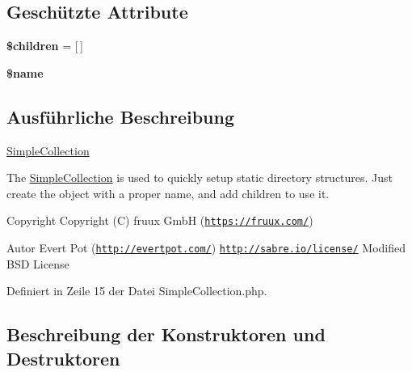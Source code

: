 \subsection*{Geschützte Attribute}
\begin{DoxyCompactItemize}
\item 
\mbox{\label{class_sabre_1_1_d_a_v_1_1_simple_collection_abfacfa128b6948de67ac5bded61922ab}} 
{\bfseries \$children} = \mbox{[}$\,$\mbox{]}
\item 
\mbox{\label{class_sabre_1_1_d_a_v_1_1_simple_collection_ae595cb2260144ca9115cd5d9b2da236e}} 
{\bfseries \$name}
\end{DoxyCompactItemize}


\subsection{Ausführliche Beschreibung}
\mbox{\hyperlink{class_sabre_1_1_d_a_v_1_1_simple_collection}{Simple\+Collection}}

The \mbox{\hyperlink{class_sabre_1_1_d_a_v_1_1_simple_collection}{Simple\+Collection}} is used to quickly setup static directory structures. Just create the object with a proper name, and add children to use it.

\begin{DoxyCopyright}{Copyright}
Copyright (C) fruux GmbH (\href{https://fruux.com/}{\tt https\+://fruux.\+com/}) 
\end{DoxyCopyright}
\begin{DoxyAuthor}{Autor}
Evert Pot (\href{http://evertpot.com/}{\tt http\+://evertpot.\+com/})  \href{http://sabre.io/license/}{\tt http\+://sabre.\+io/license/} Modified B\+SD License 
\end{DoxyAuthor}


Definiert in Zeile 15 der Datei Simple\+Collection.\+php.



\subsection{Beschreibung der Konstruktoren und Destruktoren}
\mbox{\label{class_sabre_1_1_d_a_v_1_1_simple_collection_af8dad0f593426dad74a32ca9a339e7b2}} 
